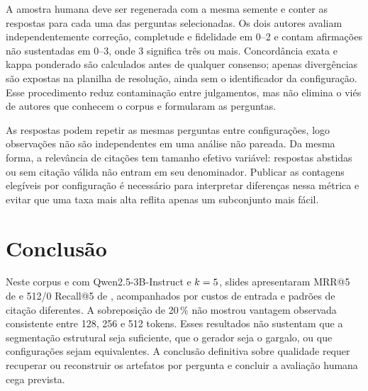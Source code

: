 \documentclass[conference]{IEEEtran}
\begin{document}
A amostra humana deve ser regenerada com a mesma semente e conter as \NConfiguracoes{} respostas para cada uma das \NPerguntasAmostra{} perguntas selecionadas.
Os dois autores avaliam independentemente correção, completude e fidelidade em 0--2 e contam afirmações não sustentadas em 0--3, onde 3 significa três ou mais.
Concordância exata e kappa ponderado são calculados antes de qualquer consenso; apenas divergências são expostas na planilha de resolução, ainda sem o identificador da configuração.
Esse procedimento reduz contaminação entre julgamentos, mas não elimina o viés de autores que conhecem o corpus e formularam as perguntas.

As respostas podem repetir as mesmas perguntas entre configurações, logo observações não são independentes em uma análise não pareada.
Da mesma forma, a relevância de citações tem tamanho efetivo variável: respostas abstidas ou sem citação válida não entram em seu denominador.
Publicar as contagens elegíveis por configuração é necessário para interpretar diferenças nessa métrica e evitar que uma taxa mais alta reflita apenas um subconjunto mais fácil.

\section{Conclusão}
Neste corpus e com Qwen2.5-3B-Instruct e $k=5$, slides apresentaram MRR@5 de \MRRSlide{} e 512/0 Recall@5 de \RecallCincoCGrdSem{}, acompanhados por custos de entrada e padrões de citação diferentes.
A sobreposição de 20\,\% não mostrou vantagem observada consistente entre 128, 256 e 512 tokens.
Esses resultados não sustentam que a segmentação estrutural seja suficiente, que o gerador seja o gargalo, ou que configurações sejam equivalentes.
A conclusão definitiva sobre qualidade requer recuperar ou reconstruir os artefatos por pergunta e concluir a avaliação humana cega prevista.



\end{document}
